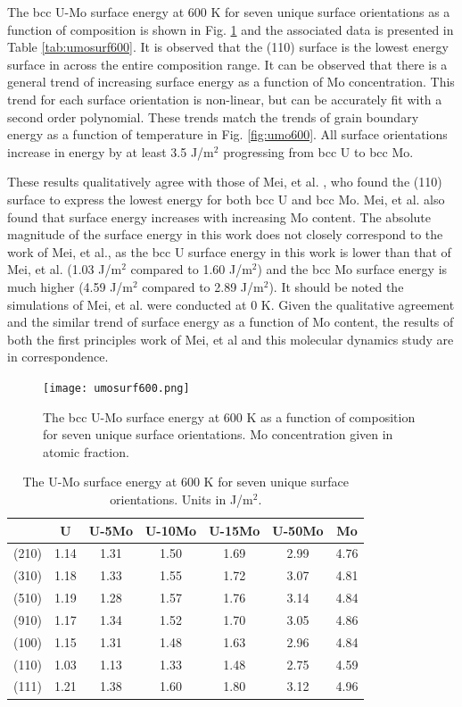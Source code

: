 \documentclass[review]{elsarticle}
\begin{document}
The bcc U-Mo surface energy at 600 K for seven unique surface orientations as a function of composition is shown in Fig. \ref{fig:umosurf600} and the associated data is presented in Table \ref{tab:umosurf600}. It is observed that the (110) surface is the lowest energy surface in across the entire composition range. It can be observed that there is a general trend of increasing surface energy as a function of Mo concentration. This trend for each surface orientation is non-linear, but can be accurately fit with a second order polynomial. These trends match the trends of grain boundary energy as a function of temperature in Fig. \ref{fig:umo600}. All surface orientations increase in energy by at least 3.5 J/m$^{2}$ progressing from bcc U to bcc Mo. 

These results qualitatively agree with those of Mei, et al. \cite{zhigang2018}, who found the (110) surface to express the lowest energy for both bcc U and bcc Mo. Mei, et al. also found that surface energy increases with increasing Mo content. The absolute magnitude of the surface energy in this work does not closely correspond to the work of Mei, et al., as the bcc U surface energy in this work is lower than that of Mei, et al. (1.03 J/m$^{2}$ compared to 1.60 J/m$^{2}$) and the bcc Mo surface energy is much higher (4.59 J/m$^{2}$ compared to 2.89 J/m$^{2}$). It should be noted the simulations of Mei, et al. were conducted at 0 K. Given the qualitative agreement and the similar trend of surface energy as a function of Mo content, the results of both the first principles work of Mei, et al \cite{zhigang2018} and this molecular dynamics study are in correspondence.

\begin{figure}[h]
 \centering
 \texttt{[image: umosurf600.png]} 
 \caption{The bcc U-Mo surface energy at 600 K as a function of composition for seven unique surface orientations. Mo concentration given in atomic fraction.}
 \label{fig:umosurf600}
\end{figure}

\begin{table}[h]
\caption{The U-Mo surface energy at 600 K for seven unique surface orientations. Units in J/m$^{2}$. } \label{tab:umosurf600}
\begin{center}
\begin{tabular}{|c|c|c|c|c|c|c|}
	\hline
 & U & U-5Mo & U-10Mo & U-15Mo & U-50Mo & Mo \\
\hline
(210) & 1.14 & 1.31 & 1.50 & 1.69 & 2.99 & 4.76 \\
(310)	 & 1.18 & 1.33 & 1.55 & 1.72 & 3.07 & 4.81 \\ 
(510)	 & 1.19 & 1.28 & 1.57 & 1.76 & 3.14 & 4.84 \\
(910)	 & 1.17 & 1.34 & 1.52 & 1.70 & 3.05 & 4.86 \\
(100)	 & 1.15 & 1.31 & 1.48 & 1.63 & 2.96 & 4.84 \\
(110)	 & 1.03 & 1.13 & 1.33 & 1.48 & 2.75 & 4.59 \\
(111)	 & 1.21 & 1.38 & 1.60 & 1.80 & 3.12 & 4.96 \\
 	 \hline
\end{tabular}
\end{center}
\label{default}
\end{table}
\end{document}
